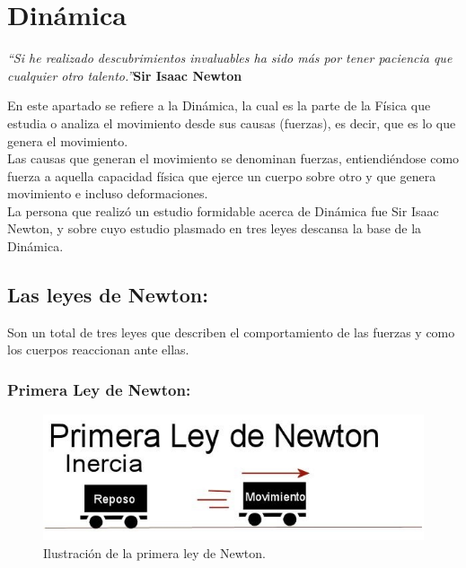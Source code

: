 \chapter{Dinámica}

\textit{``Si he realizado descubrimientos invaluables ha sido más por tener paciencia que cualquier otro talento.''}\textbf{Sir 
Isaac Newton}
\vspace{1.0cm}

En este apartado se refiere a la Dinámica, la cual es la parte de la Física que estudia o analiza el movimiento desde sus causas 
(fuerzas), es decir, que es lo que genera el movimiento.\\

Las causas que generan el movimiento se denominan fuerzas, entiendiéndose como fuerza a aquella capacidad física que ejerce un 
cuerpo sobre otro y que genera movimiento e incluso deformaciones.\\

La persona que realizó un estudio formidable acerca de Dinámica fue Sir Isaac Newton, y sobre cuyo estudio plasmado en tres leyes 
descansa la base de la Dinámica.
 
\section{Las leyes de Newton:}

Son un total de tres leyes que describen el comportamiento de las fuerzas y como los cuerpos reaccionan ante ellas.

\subsection{Primera Ley de Newton:}

\begin{figure}[ht]
 \centering
 \includegraphics[scale=0.5]{images/primera-ley-de-newton.jpg}
 \caption{Ilustración de la primera ley de Newton.}\label{ac}
\end{figure} 

